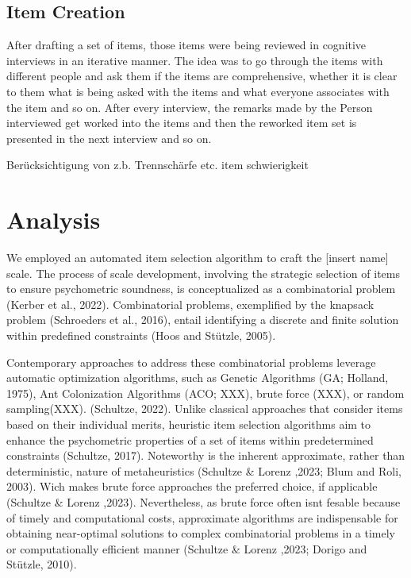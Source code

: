 \documentclass[
  12pt,
  a4paper,
  twoside]{article}
\begin{document}
\hypertarget{item-creation}{%
\subsection{Item Creation}\label{item-creation}}

After drafting a set of items, those items were being reviewed in cognitive interviews in an iterative manner. The idea was to go through the items with different people and ask them if the items are comprehensive, whether it is clear to them what is being asked with the items and what everyone associates with the item and so on. After every interview, the remarks made by the Person interviewed get worked into the items and then the reworked item set is presented in the next interview and so on.

Berücksichtigung von z.b. Trennschärfe etc. item schwierigkeit

\hypertarget{analysis}{%
\section{Analysis}\label{analysis}}

We employed an automated item selection algorithm to craft the {[}insert name{]} scale. The process of scale development, involving the strategic selection of items to ensure psychometric soundness, is conceptualized as a combinatorial problem (Kerber et al., 2022). Combinatorial problems, exemplified by the knapsack problem (Schroeders et al., 2016), entail identifying a discrete and finite solution within predefined constraints (Hoos and Stützle, 2005).

Contemporary approaches to address these combinatorial problems leverage automatic optimization algorithms, such as Genetic Algorithms (GA; Holland, 1975), Ant Colonization Algorithms (ACO; XXX), brute force (XXX), or random sampling(XXX). (Schultze, 2022).
Unlike classical approaches that consider items based on their individual merits, heuristic item selection algorithms aim to enhance the psychometric properties of a set of items within predetermined constraints (Schultze, 2017).
Noteworthy is the inherent approximate, rather than deterministic, nature of metaheuristics (Schultze \& Lorenz ,2023; Blum and Roli, 2003). Wich makes brute force approaches the preferred choice, if applicable (Schultze \& Lorenz ,2023). Nevertheless, as brute force often isnt fesable because of timely and computational costs, approximate algorithms are indispensable for obtaining near-optimal solutions to complex combinatorial problems in a timely or computationally efficient manner (Schultze \& Lorenz ,2023; Dorigo and Stützle, 2010).
\end{document}

